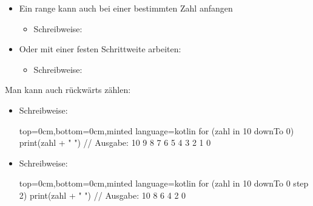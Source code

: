 \begin{frame}
    \slidehead

    \begin{itemize}
        \item Ein range kann auch bei einer bestimmten Zahl anfangen
            \begin{itemize}
                \item Schreibweise: 
            \end{itemize}
        \item Oder mit einer festen Schrittweite arbeiten:
            \begin{itemize}
                \item Schreibweise: 
            \end{itemize}
    \end{itemize}
\end{frame}

\begin{frame}[fragile]
    \slidehead

    Man kann auch rückwärts zählen:
    \begin{itemize}
        \item Schreibweise: 
            \begin{codeBlock}[]{top=0cm,bottom=0cm,minted language=kotlin}
            for (zahl in 10 downTo 0) {
                print(zahl + " ")
            }
            // Ausgabe: 10 9 8 7 6 5 4 3 2 1 0
        \end{codeBlock}
        \item Schreibweise: 
            \begin{codeBlock}[]{top=0cm,bottom=0cm,minted language=kotlin}
            for (zahl in 10 downTo 0 step 2) {
                print(zahl + " ")
            }
            // Ausgabe: 10 8 6 4 2 0
        \end{codeBlock}
    \end{itemize}
\end{frame}

